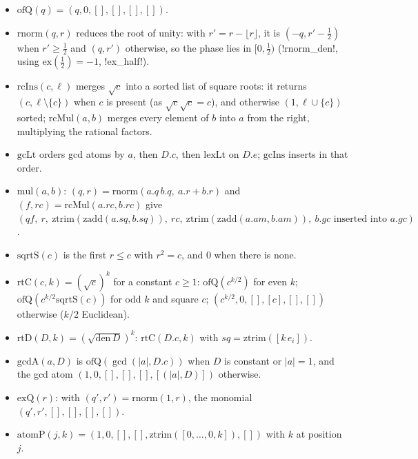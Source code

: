 \begin{definition}
\begin{itemize}
\item $\mathrm{ofQ}(q)=(q,0,[],[],[],[])$.
\item $\mathrm{rnorm}(q,r)$ reduces the root of unity: with $r'=r-\lfloor r\rfloor$, it is $(-q,r'-\tfrac12)$ when $r'\ge\tfrac12$ and $(q,r')$ otherwise, so the phase lies in $[0,\tfrac12)$ (\lean!rnorm_den!, using $\mathrm{ex}(\tfrac12)=-1$, \lean!ex_half!).
\item $\mathrm{rcIns}(c,\ell)$ merges $\sqrt c$ into a sorted list of square roots: it returns $(c,\ell\setminus\{c\})$ when $c$ is present (as $\sqrt c\sqrt c=c$), and otherwise $(1,\ell\cup\{c\})$ sorted; $\mathrm{rcMul}(a,b)$ merges every element of $b$ into $a$ from the right, multiplying the rational factors.
\item $\mathrm{gcLt}$ orders gcd atoms by $a$, then $D.c$, then $\mathrm{lexLt}$ on $D.e$; $\mathrm{gcIns}$ inserts in that order.
\item $\mathrm{mul}(a,b)$: $(q,r)=\mathrm{rnorm}(a.q\,b.q,\ a.r+b.r)$ and $(f,\mathit{rc})=\mathrm{rcMul}(a.\mathit{rc},b.\mathit{rc})$ give $(q f,\ r,\ \mathrm{ztrim}(\mathrm{zadd}(a.\mathit{sq},b.\mathit{sq})),\ \mathit{rc},\ \mathrm{ztrim}(\mathrm{zadd}(a.\mathit{am},b.\mathit{am})),\ b.\mathit{gc}\text{ inserted into }a.\mathit{gc})$.
\item $\mathrm{sqrtS}(c)$ is the first $r\le c$ with $r^2=c$, and $0$ when there is none.
\item $\mathrm{rtC}(c,k)=(\sqrt c)^k$ for a constant $c\ge1$: $\mathrm{ofQ}(c^{k/2})$ for even $k$; $\mathrm{ofQ}(c^{k/2}\mathrm{sqrtS}(c))$ for odd $k$ and square $c$; $(c^{k/2},0,[],[c],[],[])$ otherwise ($k/2$ Euclidean).
\item $\mathrm{rtD}(D,k)=(\sqrt{\mathrm{den}\,D})^k$: $\mathrm{rtC}(D.c,k)$ with $\mathit{sq}=\mathrm{ztrim}([k\,e_i])$.
\item $\mathrm{gcdA}(a,D)$ is $\mathrm{ofQ}(\gcd(|a|,D.c))$ when $D$ is constant or $|a|=1$, and the gcd atom $(1,0,[],[],[],[(|a|,D)])$ otherwise.
\item $\mathrm{exQ}(r)$: with $(q',r')=\mathrm{rnorm}(1,r)$, the monomial $(q',r',[],[],[],[])$.
\item $\mathrm{atomP}(j,k)=(1,0,[],[],\mathrm{ztrim}([0,\dots,0,k]),[])$ with $k$ at position $j$.
\end{itemize}
\end{definition}

